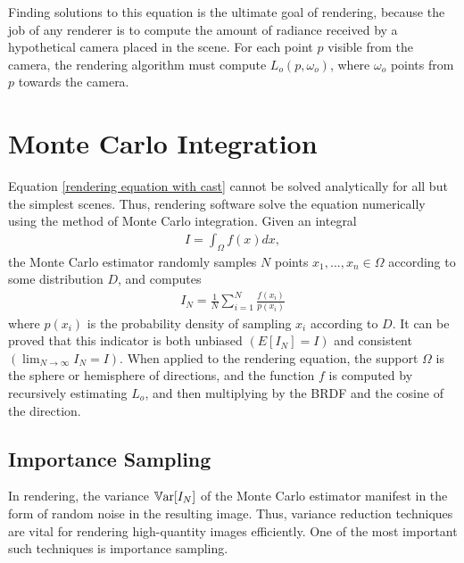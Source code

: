 Finding solutions to this equation is the ultimate goal of rendering, because the job of any renderer is to compute the amount of radiance received by a hypothetical camera placed in the scene. For each point $p$ visible from the camera, the rendering algorithm must compute $L_o(p,\omega_o)$, where $\omega_o$ points from $p$ towards the camera. 

\section{Monte Carlo Integration}

Equation \ref{rendering equation with cast} cannot be solved analytically for all but the simplest scenes. Thus, rendering software solve the equation numerically using the method of Monte Carlo integration. Given an integral
\begin{align*}
    I = \int_\Omega f(x) dx,
\end{align*}
the Monte Carlo estimator randomly samples $N$ points $x_1,...,x_n\in \Omega$ according to some distribution $D$, and computes
\begin{align}
    I_N = \frac{1}{N}\sum_{i=1}^{N} \frac{f(x_i)}{p(x_i)}
    \label{monte carlo estimator}
\end{align}
where $p(x_i)$ is the probability density of sampling $x_i$ according to $D$. It can be proved that this indicator is both unbiased $(E[I_N]=I)$ and consistent $(\lim_{N\to\infty}I_N = I)$. When applied to the rendering equation, the support $\Omega$ is the sphere or hemisphere of directions, and the function $f$ is computed by recursively estimating $L_o$, and then multiplying by the BRDF and the cosine of the direction.

\subsection{Importance Sampling}
\label{subsection IS}
In rendering, the variance $\mathbb{V}\text{ar}[I_N]$ of the Monte Carlo estimator manifest in the form of random noise in the resulting image. Thus, variance reduction techniques are vital for rendering high-quantity images efficiently. One of the most important such techniques is importance sampling.

